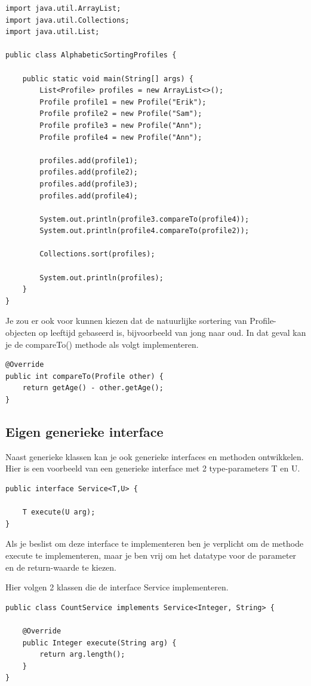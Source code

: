 \documentclass{tstextbook}
\begin{document}
\begin{lstlisting}
import java.util.ArrayList;
import java.util.Collections;
import java.util.List;

public class AlphabeticSortingProfiles {

	public static void main(String[] args) {
		List<Profile> profiles = new ArrayList<>();
		Profile profile1 = new Profile("Erik");
		Profile profile2 = new Profile("Sam");
		Profile profile3 = new Profile("Ann");
		Profile profile4 = new Profile("Ann");

		profiles.add(profile1);
		profiles.add(profile2);
		profiles.add(profile3);
		profiles.add(profile4);

		System.out.println(profile3.compareTo(profile4));
		System.out.println(profile4.compareTo(profile2));

		Collections.sort(profiles);
		
		System.out.println(profiles);
	}
}
\end{lstlisting}

Je zou er ook voor kunnen kiezen dat de natuurlijke sortering van Profile-objecten op leeftijd gebaseerd is, bijvoorbeeld van jong naar oud. In dat geval kan je de compareTo() methode als volgt implementeren.

\begin{lstlisting}
@Override
public int compareTo(Profile other) {
	return getAge() - other.getAge();
}
\end{lstlisting}

\subsection{Eigen generieke interface}

Naast generieke klassen kan je ook generieke interfaces en methoden ontwikkelen.
Hier is een voorbeeld van een generieke interface met 2 type-parameters T en U.

\begin{lstlisting}
public interface Service<T,U> {

	T execute(U arg);
}
\end{lstlisting}

Als je beslist om deze interface te implementeren ben je verplicht om de methode execute te implementeren, maar je ben vrij om het datatype voor de parameter en de return-waarde te kiezen.

Hier volgen 2 klassen die de interface Service implementeren.

\begin{lstlisting}
public class CountService implements Service<Integer, String> {

	@Override
	public Integer execute(String arg) {
		return arg.length();
	}
}
\end{lstlisting}
\end{document}
